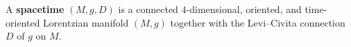 A \textbf{spacetime} $(M, g, D)$ is a connected $4$-dimensional, oriented, and time-oriented Lorentzian manifold $(M, g)$ together with the Levi--Civita connection $D$ of $g$ on $M$.
